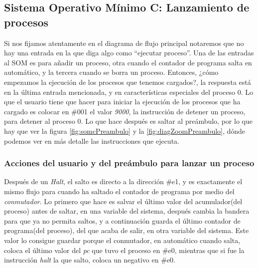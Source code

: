 \documentclass[letterpaper,12pt,oneside]{book}
\begin{document}
		
		
		\subsection{Sistema Operativo Mínimo C: Lanzamiento de procesos}
  
		
		
		Si nos fijamos atentamente en el diagrama de flujo principal notaremos que no hay una entrada en la que diga algo como ``ejecutar proceso''. Una
		de las entradas al SOM es para añadir un proceso, otra cuando el contador de programa salta en automático, y la tercera cuando se borra
		un proceso. Entonces, ¿cómo empezamos la ejecución de los procesos que tenemos cargados?, la respuesta está en la última entrada mencionada, y
		en características especiales del proceso 0. Lo que el usuario tiene que hacer para iniciar la ejecución de los procesos
		que ha cargado es colocar en \#001 el valor \textit{9000}, la instrucción de detener un proceso, para detener al proceso 0. Lo que hace después
		es saltar al preámbulo, por lo que hay que ver la figura \ref{fig:somcPreambulo}
		y la \ref{fig:diagZoomPreambulo}, dónde podemos ver en más detalle las instrucciones que ejecuta.
		\subsubsection{Acciones del usuario y del preámbulo para lanzar un proceso}
  
		Después de un \textit{Halt}, el salto es directo a la
		dirección \#e1, y es exactamente el mismo flujo para cuando ha saltado el contador de programa por medio del \textit{conmutador}. Lo primero
		que hace es salvar el último valor del acumulador(del proceso) antes de saltar, en una variable del sistema, después cambia la bandera para que ya no permita 
		saltos, y a continuación guarda el último contador de programa(del proceso), del que acaba de salir, en otra variable del sistema. Este valor lo consigue guardar
		porque el conmutador, en automático cuando salta, coloca el último valor del \textit{pc} que tuvo el proceso en \#e0, mientras que si fue la instrucción
		\textit{halt} la que salto, coloca un negativo en \#e0.
\end{document}

